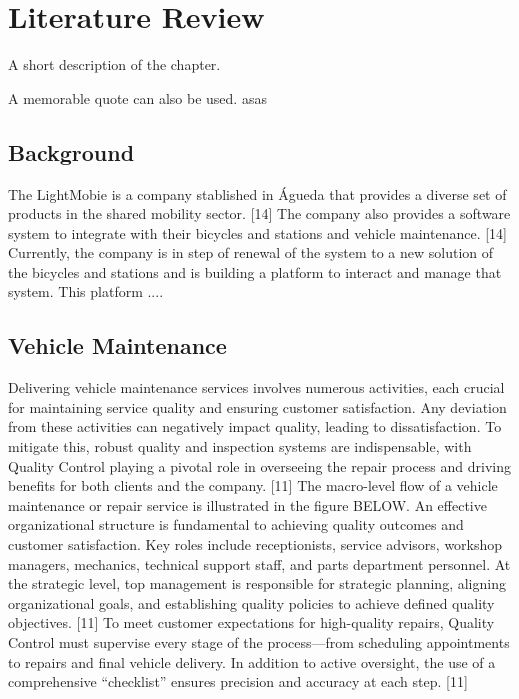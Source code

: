 \chapter{Literature Review}%
\label{chapter:literatureReview}

\begin{introduction}
A short description of the chapter.

A memorable quote can also be used. asas
\end{introduction} 


\section{Background}
The LightMobie is a company stablished in Águeda that provides a diverse set of products in the shared mobility sector. [14]
The company also provides a software system to integrate with their bicycles and stations and vehicle maintenance. [14]
Currently, the company is in step of renewal of the system to a new solution of the bicycles and stations and is building a platform to interact and manage that system.
This platform ....

\section{Vehicle Maintenance}

Delivering vehicle maintenance services involves numerous activities, each crucial for maintaining service quality and ensuring customer satisfaction. Any deviation from these activities can negatively impact quality, leading to dissatisfaction. To mitigate this, robust quality and inspection systems are indispensable, with Quality Control playing a pivotal role in overseeing the repair process and driving benefits for both clients and the company. [11]
The macro-level flow of a vehicle maintenance or repair service is illustrated in the figure BELOW. An effective organizational structure is fundamental to achieving quality outcomes and customer satisfaction. Key roles include receptionists, service advisors, workshop managers, mechanics, technical support staff, and parts department personnel. At the strategic level, top management is responsible for strategic planning, aligning organizational goals, and establishing quality policies to achieve defined quality objectives. [11]
To meet customer expectations for high-quality repairs, Quality Control must supervise every stage of the process—from scheduling appointments to repairs and final vehicle delivery. In addition to active oversight, the use of a comprehensive “checklist” ensures precision and accuracy at each step. [11]

